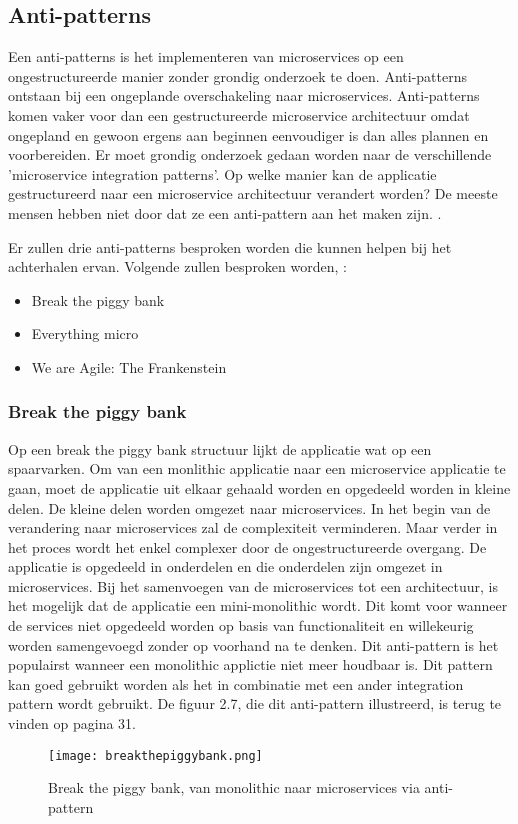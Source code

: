 \subsection{Anti-patterns}
Een anti-patterns is het implementeren van microservices op een ongestructureerde manier zonder grondig onderzoek te doen. 
Anti-patterns ontstaan bij een ongeplande overschakeling naar microservices.  Anti-patterns komen vaker voor dan een gestructureerde microservice architectuur omdat ongepland en gewoon ergens aan beginnen eenvoudiger is dan alles plannen en voorbereiden. Er moet grondig onderzoek gedaan worden naar de verschillende 'microservice integration patterns'. Op welke manier kan de applicatie gestructureerd naar een microservice architectuur verandert worden?
De meeste mensen hebben niet door dat ze een anti-pattern aan het maken zijn. . 

Er zullen drie anti-patterns besproken worden die kunnen helpen bij het achterhalen ervan. Volgende zullen besproken worden, \textcite{Monson2019}:
\begin{itemize}
	\item Break the piggy bank
	\item Everything micro
	\item We are Agile: The Frankenstein
\end{itemize}
\subsubsection{Break the piggy bank}
Op een break the piggy bank structuur lijkt de applicatie wat op een spaarvarken. Om van een monlithic applicatie naar een microservice applicatie te gaan, moet de applicatie uit elkaar gehaald worden en opgedeeld worden in kleine delen.  De kleine delen worden omgezet naar microservices. 
In het begin van de verandering naar microservices zal de complexiteit verminderen. Maar  verder in het proces wordt het enkel complexer door de ongestructureerde overgang.
De applicatie is opgedeeld in onderdelen en die onderdelen zijn omgezet in microservices. Bij het samenvoegen van de microservices tot een architectuur, is het mogelijk dat de applicatie een mini-monolithic wordt. Dit komt voor wanneer de services niet opgedeeld worden op basis van functionaliteit en willekeurig worden samengevoegd zonder op voorhand na te denken.
Dit anti-pattern is het populairst wanneer een monolithic applictie niet meer houdbaar is. Dit pattern kan goed gebruikt worden als het in combinatie met een ander integration pattern wordt gebruikt.
De figuur 2.7, die dit anti-pattern illustreerd, is terug te vinden op pagina 31.
\begin{figure}[h!]
	\texttt{[image: breakthepiggybank.png]}
	\centering
	\caption{Break the piggy bank, van monolithic naar microservices via anti-pattern \textcite{Monson2019}}
\end{figure}

